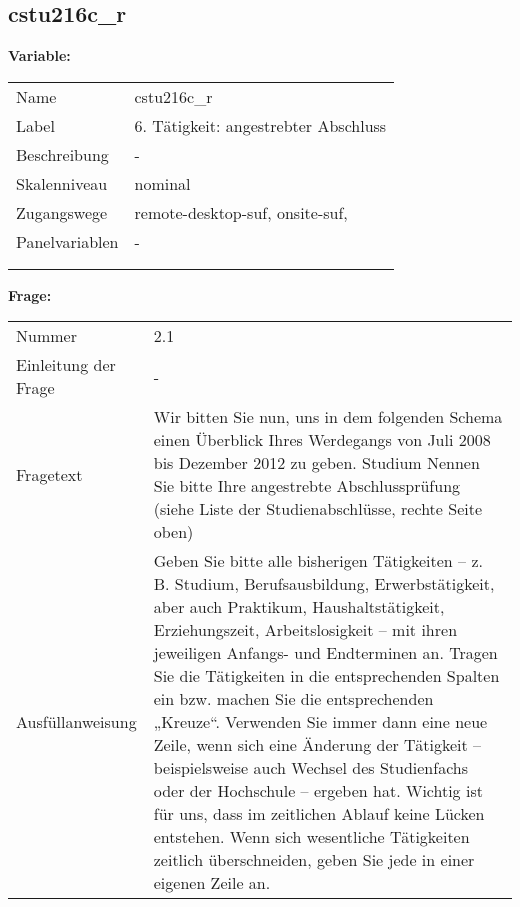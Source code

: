 	
	
	\subsection{cstu216c\_r}
	\label{subSection:cstu216c_r}

	\noindent\textbf{Variable:}\\
		\begin{tabular}{lL{11.3cm}}
			\label{tableVariable:cstu216c_r}
			Name & cstu216c\_r \\
			Label & 6. Tätigkeit: angestrebter Abschluss \\
			Beschreibung & - \\
			Skalenniveau & nominal \\
			Zugangswege &
				remote-desktop-suf,
				onsite-suf,
 \\
			Panelvariablen & -
			 \\
			 \\
 \\
		\end{tabular}

		\vspace*{1 cm}
		\noindent\textbf{Frage:}\\
		\begin{tabular}{lL{11.3cm}}
			\label{tableQuestion:cstu216c_r}
			Nummer & 2.1 \\
			Einleitung der Frage & - \\
			Fragetext & Wir bitten Sie nun, uns in dem folgenden Schema einen Überblick Ihres Werdegangs von Juli 2008 bis Dezember 2012 zu geben.
Studium
Nennen Sie bitte Ihre angestrebte Abschlussprüfung 
(siehe Liste der Studienabschlüsse, rechte Seite oben) \\
			Ausfüllanweisung & Geben Sie bitte alle bisherigen Tätigkeiten – z. B. Studium, Berufsausbildung, Erwerbstätigkeit, aber auch Praktikum, Haushaltstätigkeit,
Erziehungszeit, Arbeitslosigkeit – mit ihren jeweiligen Anfangs- und Endterminen an. Tragen Sie die Tätigkeiten in die entsprechenden Spalten ein bzw. machen Sie die entsprechenden „Kreuze“. Verwenden Sie immer dann eine neue Zeile, wenn sich eine Änderung der Tätigkeit – beispielsweise auch Wechsel des Studienfachs oder der Hochschule – ergeben hat. Wichtig ist für uns, dass im zeitlichen Ablauf keine Lücken entstehen. Wenn sich wesentliche Tätigkeiten zeitlich überschneiden, geben Sie jede in einer eigenen Zeile an. \\
		\end{tabular}





